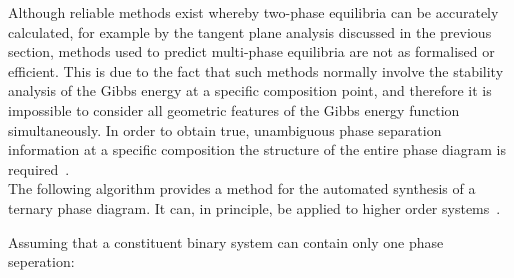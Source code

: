 Although reliable methods exist whereby two-phase equilibria can be accurately calculated, for example by the tangent plane analysis discussed in the previous section, methods used to predict multi-phase equilibria are not as formalised or efficient. This is due to the fact that such methods normally involve the stability analysis of the Gibbs energy at a specific composition point, and therefore it is impossible to consider all geometric features of the Gibbs energy function simultaneously. In order to obtain true, unambiguous  phase separation information at a specific composition the structure of the entire phase diagram is required~\cite{HessianPhaseDiagramConstruction}.\\

The following algorithm provides a method for the automated synthesis of a ternary phase diagram. It can, in principle, be applied to higher order systems~\cite{HessianPhaseDiagramConstruction}.\

Assuming that a constituent binary system can contain only one phase seperation:

